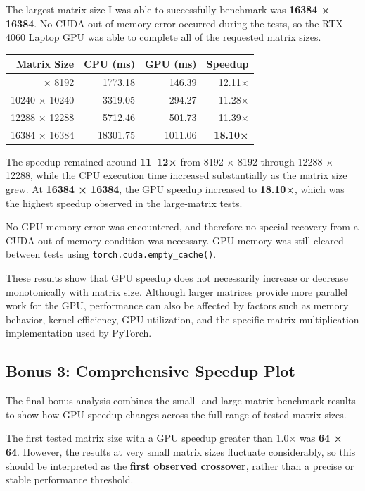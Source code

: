 \documentclass[11pt]{article}
\begin{document}
The largest matrix size I was able to successfully benchmark was
\textbf{16384 × 16384}. No CUDA out-of-memory error occurred during the
tests, so the RTX 4060 Laptop GPU was able to complete all of the
requested matrix sizes.

{\def\LTcaptype{table} %
\begin{longtable}[]{@{}rrrr@{}}
\toprule\noalign{}
Matrix Size & CPU (ms) & GPU (ms) & Speedup \\
\midrule\noalign{}
\endhead
\bottomrule\noalign{}
\endlastfoot
8192 × 8192 & 1773.18 & 146.39 & 12.11× \\
10240 × 10240 & 3319.05 & 294.27 & 11.28× \\
12288 × 12288 & 5712.46 & 501.73 & 11.39× \\
16384 × 16384 & 18301.75 & 1011.06 & \textbf{18.10×} \\
\end{longtable}
}

The speedup remained around \textbf{11--12×} from 8192 × 8192 through
12288 × 12288, while the CPU execution time increased substantially as
the matrix size grew. At \textbf{16384 × 16384}, the GPU speedup
increased to \textbf{18.10×}, which was the highest speedup observed in
the large-matrix tests.

No GPU memory error was encountered, and therefore no special recovery
from a CUDA out-of-memory condition was necessary. GPU memory was still
cleared between tests using \texttt{torch.cuda.empty\_cache()}.

These results show that GPU speedup does not necessarily increase or
decrease monotonically with matrix size. Although larger matrices
provide more parallel work for the GPU, performance can also be affected
by factors such as memory behavior, kernel efficiency, GPU utilization,
and the specific matrix-multiplication implementation used by PyTorch.

    \subsection{Bonus 3: Comprehensive Speedup
Plot}\label{bonus-3-comprehensive-speedup-plot}

The final bonus analysis combines the small- and large-matrix benchmark
results to show how GPU speedup changes across the full range of tested
matrix sizes.

The first tested matrix size with a GPU speedup greater than 1.0× was
\textbf{64 × 64}. However, the results at very small matrix sizes
fluctuate considerably, so this should be interpreted as the
\textbf{first observed crossover}, rather than a precise or stable
performance threshold.
\end{document}
